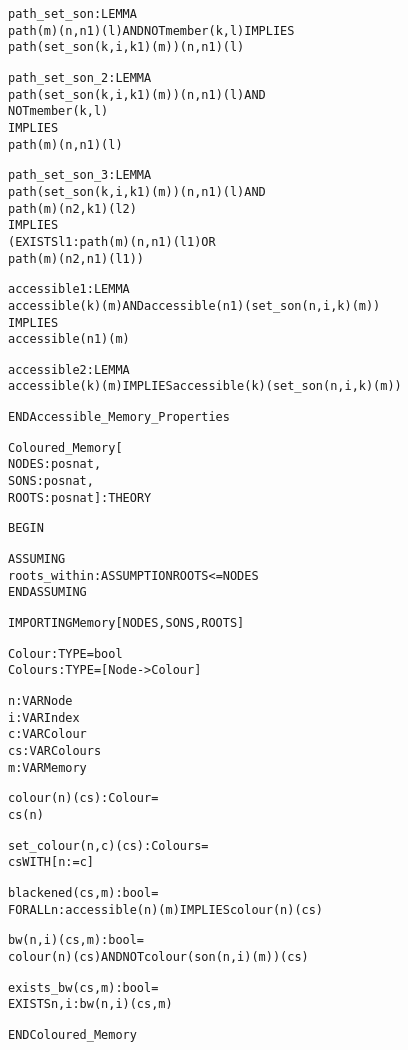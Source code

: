\begin{alltt}
  path_set_son: LEMMA
    path(m)(n, n1)(l) AND NOT member(k, l) IMPLIES 
      path(set_son(k, i, k1)(m))(n, n1)(l)

  path_set_son_2: LEMMA
    path(set_son(k, i, k1)(m))(n, n1)(l) AND
    NOT member(k, l)
      IMPLIES 
    path(m)(n, n1)(l)

  path_set_son_3: LEMMA
    path(set_son(k, i, k1)(m))(n, n1)(l) AND
    path(m)(n2, k1)(l2)
      IMPLIES 
    (EXISTS l1: path(m)(n, n1)(l1) OR
                path(m)(n2, n1)(l1))

  accessible1 : LEMMA
    accessible(k)(m) AND accessible(n1)(set_son(n,i,k)(m))
      IMPLIES
    accessible(n1)(m)

  accessible2 : LEMMA
    accessible(k)(m) IMPLIES accessible(k)(set_son(n,i,k)(m))

END Accessible_Memory_Properties
\end{alltt}


\newpage
\begin{alltt}
%%%%%%%%%%%%%%%%%%%%%%%%%%%%%%%%%%%%%%%%%%%%%%%%%%%%%%%%%%%%%%
% Coloured_Memory :                                          %          
%   Defines functions to colour (and examine the colours of) %
%   memory nodes.                                            %
%%%%%%%%%%%%%%%%%%%%%%%%%%%%%%%%%%%%%%%%%%%%%%%%%%%%%%%%%%%%%%

Coloured_Memory[
  NODES : posnat, 
  SONS  : posnat, 
  ROOTS : posnat] : THEORY

BEGIN

  ASSUMING
    roots_within : ASSUMPTION ROOTS <= NODES
  ENDASSUMING

  IMPORTING Memory[NODES,SONS,ROOTS]

  Colour  : TYPE = bool
  Colours : TYPE = [Node -> Colour]

  n  : VAR Node
  i  : VAR Index
  c  : VAR Colour
  cs : VAR Colours
  m  : VAR Memory

  colour(n)(cs):Colour = 
    cs(n)
 
  set_colour(n,c)(cs):Colours = 
    cs WITH [n := c]

  blackened(cs,m):bool =
    FORALL n: accessible(n)(m) IMPLIES colour(n)(cs)

  bw(n,i)(cs,m):bool =
    colour(n)(cs) AND NOT colour(son(n,i)(m))(cs)

  exists_bw(cs,m):bool =
    EXISTS n,i: bw(n,i)(cs,m)

END Coloured_Memory
\end{alltt}

